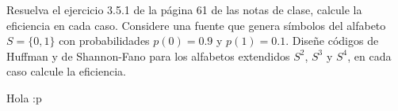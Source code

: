 
Resuelva el ejercicio 3.5.1 de la página 61 de las notas de clase, calcule la eficiencia en cada caso. Considere una fuente que genera símbolos del alfabeto $S =\{0, 1\}$ con probabilidades $p(0) = 0.9$ y $p(1) = 0.1$. Diseñe códigos de Huffman y de Shannon-Fano para los alfabetos extendidos $S^2$, $S^{3}$ y $S^{4}$, en cada caso calcule
la eficiencia.

\begin{sol}
    Hola :p
\end{sol}